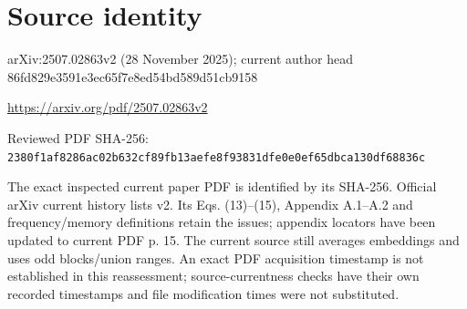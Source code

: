 \documentclass[11pt]{article}
\begin{document}
\section*{Source identity}

arXiv:2507.02863v2 (28 November 2025); current author head 86fd829e3591e3ec65f7e8ed54bd589d51cb9158

\url{https://arxiv.org/pdf/2507.02863v2}

Reviewed PDF SHA-256: \nolinkurl{2380f1af8286ac02b632cf89fb13aefe8f93831dfe0e0ef65dbca130df68836c}

The exact inspected current paper PDF is identified by its SHA-256. Official arXiv current history lists v2. Its Eqs. (13)–(15), Appendix A.1–A.2 and frequency/memory definitions retain the issues; appendix locators have been updated to current PDF p. 15. The current source still averages embeddings and uses odd blocks/union ranges. An exact PDF acquisition timestamp is not established in this reassessment; source-currentness checks have their own recorded timestamps and file modification times were not substituted.
\end{document}
